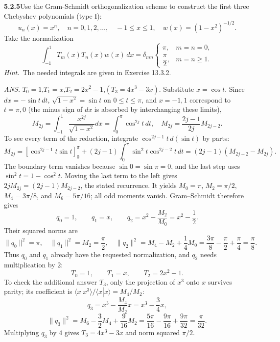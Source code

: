 \par\bigskip
\noindent\textbf{5.2.5}\quad Use the Gram-Schmidt orthogonalization scheme to
construct the first three Chebyshev polynomials (type I):
\[
u_{n}(x)=x^{n},\quad n=0,1,2,\ldots,\quad-1\le x\le1,\quad
w(x)=(1-x^{2})^{-1/2}.
\]
Take the normalization
\[
\int_{-1}^{1}T_{m}(x)T_{n}(x)w(x)\,dx
=\delta_{mn}\begin{cases}\pi,&m=n=0,\\[1ex]
\dfrac{\pi}{2},&m=n\ge1.
\end{cases}
\]
\emph{Hint.}~The needed integrals are given in Exercise 13.3.2.
\par\nobreak\hfill\emph{ANS.}\enspace
$T_{0}=1$,\quad$T_{1}=x$,\quad$T_{2}=2x^{2}-1$,\quad$(T_{3}=4x^{3}-3x)$.
\solution
Substitute $x=\cos t$. Since $dx=-\sin t\,dt$,
$\sqrt{1-x^2}=\sin t$ on $0\le t\le\pi$, and $x=-1,1$ correspond to
$t=\pi,0$ (the minus sign of $dx$ is absorbed by interchanging these
limits),
\[
M_{2j}=\int_{-1}^1\frac{x^{2j}}{\sqrt{1-x^2}}dx
=\int_0^\pi\cos^{2j}t\,dt,
\quad M_{2j}=\frac{2j-1}{2j}M_{2j-2}.
\]
To see every term of the reduction, integrate
$\cos^{2j-1}t\,d(\sin t)$ by parts:
\[
M_{2j}=[\cos^{2j-1}t\sin t]_0^\pi
 +(2j-1)\int_0^\pi\sin^2t\cos^{2j-2}t\,dt
 =(2j-1)(M_{2j-2}-M_{2j}).
\]
The boundary term vanishes because $\sin0=\sin\pi=0$, and the last step
uses $\sin^2t=1-\cos^2t$. Moving the last term to the left gives
$2jM_{2j}=(2j-1)M_{2j-2}$, the stated recurrence. It yields
$M_0=\pi$, $M_2=\pi/2$, $M_4=3\pi/8$, and $M_6=5\pi/16$;
all odd moments vanish. Gram--Schmidt therefore gives
\[
q_0=1,\qquad q_1=x,\qquad
q_2=x^2-\frac{M_2}{M_0}=x^2-\frac12.
\]
Their squared norms are
\[
\|q_0\|^2=\pi,\quad \|q_1\|^2=M_2=\frac\pi2,\quad
\|q_2\|^2=M_4-M_2+\frac14M_0
=\frac{3\pi}8-\frac\pi2+\frac\pi4=\frac\pi8.
\]
Thus $q_0$ and $q_1$ already have the requested normalization, and $q_2$
needs multiplication by $2$:
\[
\boxed{T_0=1,\qquad T_1=x,\qquad T_2=2x^2-1}.
\]
To check the additional answer $T_3$, only the projection of $x^3$ onto
$x$ survives parity; its coefficient is
$\langle x|x^3\rangle/\langle x|x\rangle=M_4/M_2$:
\[
q_3=x^3-\frac{M_4}{M_2}x=x^3-\frac34x,
\]
\[
\|q_3\|^2=M_6-\frac32M_4+\frac9{16}M_2
=\frac{5\pi}{16}-\frac{9\pi}{16}+\frac{9\pi}{32}
=\frac\pi{32}.
\]
Multiplying $q_3$ by $4$ gives $T_3=4x^3-3x$ and norm squared $\pi/2$.

